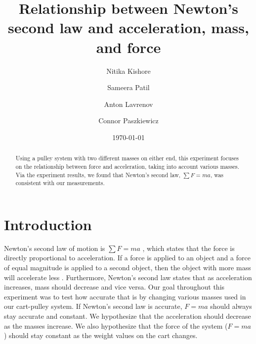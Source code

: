 ﻿\documentclass[reprint,amsmath,amssymb,aps,twoside]{revtex4-2}
\begin{document}
\setcounter{page}{21}
\title{Relationship between Newton’s second law and acceleration, mass, and force}
\author{Nitika Kishore}
\author{Sameera Patil}
\author{Anton Lavrenov}
\author{Connor Paszkiewicz}
\date{\today}

\begin{abstract}
Using a pulley system with two different masses on either end, this experiment focuses on the relationship between force and acceleration, taking into account various masses. Via the experiment results, we found that Newton’s second law, $\sum F = ma$, was consistent with our measurements. 
\end{abstract}


\maketitle\thispagestyle{mytitlepage}
  
\section{Introduction}
Newton's second law of motion is $\sum F=ma$ \cite{tipler}, which states that the force is directly proportional to acceleration. If a force is applied to an object and a force of equal magnitude is applied to a second object, then the object with more mass will accelerate less \cite{tipler}. Furthermore, Newton’s second law states that as acceleration increases, mass should decrease and vice versa. Our goal throughout this experiment was to test how accurate that is by changing various masses used in our cart-pulley system. If Newton’s second law is accurate, $F=ma$ should always stay accurate and constant. We hypothesize that the acceleration should decrease as the masses increase. We also hypothesize that the force of the system ($F=ma$) should stay constant as the weight values on the cart changes. 
\end{document}
